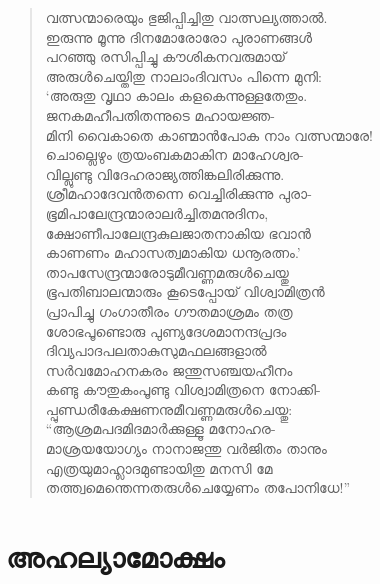 \begin{verse}
വത്സന്മാരെയും ഭുജിപ്പിച്ചിതു വാത്സല്യത്താല്‍.\\
ഇരുന്നു മൂന്നു ദിനമോരോരോ പുരാണങ്ങള്‍\\
പറഞ്ഞു രസിപ്പിച്ചു കൗശികനവരുമായ്\\
അരുള്‍ചെയ്തിതു നാലാംദിവസം പിന്നെ മുനി:\\
‘അരുതു വൃഥാ കാലം കളകെന്നുള്ളതേതും.\\
ജനകമഹീപതിതന്നുടെ മഹായജ്ഞ-\\
മിനി വൈകാതെ കാണ്മാന്‍പോക നാം \hbox{വത്സന്മാരേ!}\\
ചൊല്ലെഴും ത്രയംബകമാകിന മാഹേശ്വര-\\
വില്ലുണ്ടു വിദേഹരാജ്യത്തിങ്കലിരിക്കുന്നു.\\
ശ്രീമഹാദേവന്‍തന്നെ വെച്ചിരിക്കുന്നു പുരാ-\\
ഭൂമിപാലേന്ദ്രന്മാരാലര്‍ച്ചിതമനുദിനം,\\
ക്ഷോണീപാലേന്ദ്രകുലജാതനാകിയ ഭവാന്‍\\
കാണണം മഹാസത്വമാകിയ ധനൂരത്നം.’\\
താപസേന്ദ്രന്മാരോടുമീവണ്ണമരുള്‍ചെയ്തു\\
ഭൂപതിബാലന്മാരും കൂടെപ്പോയ് വിശ്വാമിത്രന്‍\\
പ്രാപിച്ചു ഗംഗാതീരം ഗൗതമാശ്രമം തത്ര\\
ശോഭപൂണ്ടൊരു പുണ്യദേശമാനന്ദപ്രദം\\
ദിവ്യപാദപലതാകുസുമഫലങ്ങളാല്‍\\
സര്‍വമോഹനകരം ജന്തുസഞ്ചയഹീനം\\
കണ്ടു കൗതുകംപൂണ്ടു വിശ്വാമിത്രനെ നോക്കി-\\
പ്പുണ്ഡരീകേക്ഷണനുമീവണ്ണമരുള്‍ചെയ്തു:\\
“ആശ്രമപദമിദമാര്‍ക്കുള്ളൂ മനോഹര-\\
മാശ്രയയോഗ്യം നാനാജന്തു വര്‍ജിതം താനും\\
എത്രയുമാഹ്ലാദമുണ്ടായിതു മനസി മേ\\
തത്ത്വമെന്തെന്നതരുള്‍ചെയ്യേണം തപോനിധേ!”
\end{verse}


\section{അഹല്യാമോക്ഷം}

